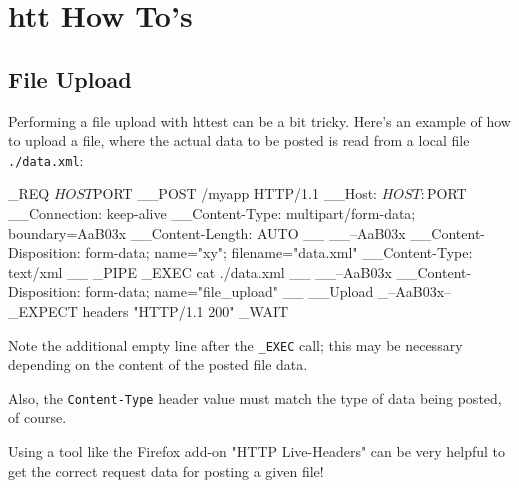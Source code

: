 \chapter{htt How To's}
\label{chap:howtos}

\section{File Upload}

Performing a file upload with httest can be a bit tricky. Here's an example of 
how to upload a file, where the actual data to be posted is read from a local 
file \texttt{./data.xml}:

\begin{usplisting}
    _REQ $HOST $PORT
    __POST /myapp HTTP/1.1
    __Host: $HOST:$PORT
    __Connection: keep-alive
    __Content-Type: multipart/form-data; boundary=AaB03x
    __Content-Length: AUTO
    __
    __--AaB03x
    __Content-Disposition: form-data; name="xy"; filename="data.xml"
    __Content-Type: text/xml
    __
    _PIPE
    _EXEC cat ./data.xml
    __
    __--AaB03x
    __Content-Disposition: form-data; name="file_upload"
    __
    __Upload
    _--AaB03x--
    _EXPECT headers "HTTP/1.1 200"
    _WAIT
\end{usplisting}

Note the additional empty line after the \texttt{\_EXEC} call; this may be necessary 
depending on the content of the posted file data.

Also, the \texttt{Content-Type} header value must match the type of data 
being posted, of course.

Using a tool like the Firefox add-on "HTTP Live-Headers" can be very helpful to 
get the correct request data for posting a given file!